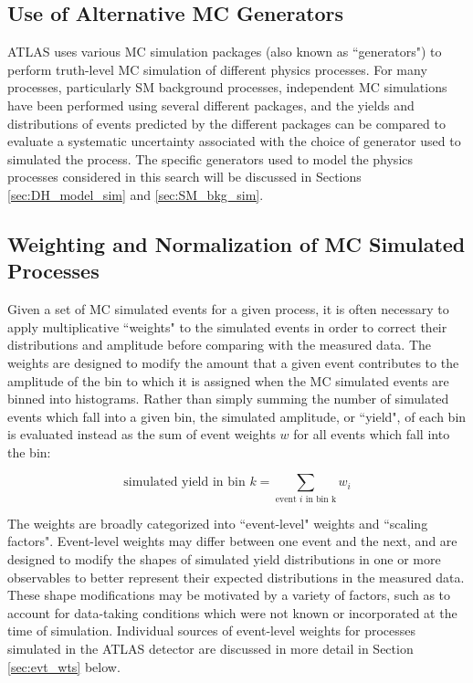 \subsection{Use of Alternative MC Generators}

ATLAS uses various MC simulation packages (also known as ``generators") to perform truth-level MC simulation of different physics processes. For many processes, particularly SM background processes, independent MC simulations have been performed using several different packages, and the yields and distributions of events predicted by the different packages can be compared to evaluate a systematic uncertainty associated with the choice of generator used to simulated the process. The specific generators used to model the physics processes considered in this search will be discussed in Sections \ref{sec:DH_model_sim} and \ref{sec:SM_bkg_sim}.

\subsection{Weighting and Normalization of MC Simulated Processes}
\label{sec:evt_weights}

Given a set of MC simulated events for a given process, it is often necessary to apply multiplicative ``weights" to the simulated events in order to correct their distributions and amplitude before comparing with the measured data. The weights are designed to modify the amount that a given event contributes to the amplitude of the bin to which it is assigned when the MC simulated events are binned into histograms. Rather than simply summing the number of simulated events which fall into a given bin, the simulated amplitude, or ``yield", of each bin is evaluated instead as the sum of event weights \(w\) for all events which fall into the bin:

\begin{equation}
\label{eq:weighted_bin_amplitude}
\text{simulated yield in bin \(k\)} = \sum_\text{event \(i\) in bin k} w_i
\end{equation}

The weights are broadly categorized into ``event-level" weights and ``scaling factors". Event-level weights may differ between one event and the next, and are designed to modify the shapes of simulated yield distributions in one or more observables to better represent their expected distributions in the measured data. These shape modifications may be motivated by a variety of factors, such as to account for data-taking conditions which were not known or incorporated at the time of simulation. Individual sources of event-level weights for processes simulated in the ATLAS detector are discussed in more detail in Section \ref{sec:evt_wts} below. 

